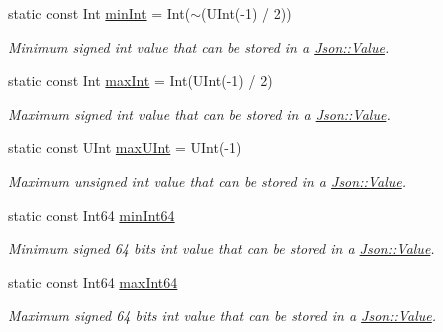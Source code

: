 \begin{DoxyCompactItemize}
\mbox{\label{classJson_1_1Value_a7df8a39e2502b8c92a6a41e3d752d2c8}} 
static const Int \hyperlink{classJson_1_1Value_a7df8a39e2502b8c92a6a41e3d752d2c8}{min\+Int} = Int($\sim$(U\+Int(-\/1) / 2))
\begin{DoxyCompactList}\small\item\em Minimum signed int value that can be stored in a \hyperlink{classJson_1_1Value}{Json\+::\+Value}. \end{DoxyCompactList}\item 
\mbox{\label{classJson_1_1Value_a978c799a8af3114ef7dab6fd0a310a1b}} 
static const Int \hyperlink{classJson_1_1Value_a978c799a8af3114ef7dab6fd0a310a1b}{max\+Int} = Int(U\+Int(-\/1) / 2)
\begin{DoxyCompactList}\small\item\em Maximum signed int value that can be stored in a \hyperlink{classJson_1_1Value}{Json\+::\+Value}. \end{DoxyCompactList}\item 
\mbox{\label{classJson_1_1Value_ac79e63ee68d3aa914bfd6988be669b87}} 
static const U\+Int \hyperlink{classJson_1_1Value_ac79e63ee68d3aa914bfd6988be669b87}{max\+U\+Int} = U\+Int(-\/1)
\begin{DoxyCompactList}\small\item\em Maximum unsigned int value that can be stored in a \hyperlink{classJson_1_1Value}{Json\+::\+Value}. \end{DoxyCompactList}\item 
\mbox{\label{classJson_1_1Value_a815ef899bc312c93bc426511acfe31a7}} 
static const Int64 \hyperlink{classJson_1_1Value_a815ef899bc312c93bc426511acfe31a7}{min\+Int64}
\begin{DoxyCompactList}\small\item\em Minimum signed 64 bits int value that can be stored in a \hyperlink{classJson_1_1Value}{Json\+::\+Value}. \end{DoxyCompactList}\item 
\mbox{\label{classJson_1_1Value_a4492634870b8c5709ce967b384ac6006}} 
static const Int64 \hyperlink{classJson_1_1Value_a4492634870b8c5709ce967b384ac6006}{max\+Int64}
\begin{DoxyCompactList}\small\item\em Maximum signed 64 bits int value that can be stored in a \hyperlink{classJson_1_1Value}{Json\+::\+Value}. \end{DoxyCompactList}\item 

\end{DoxyCompactItemize}
